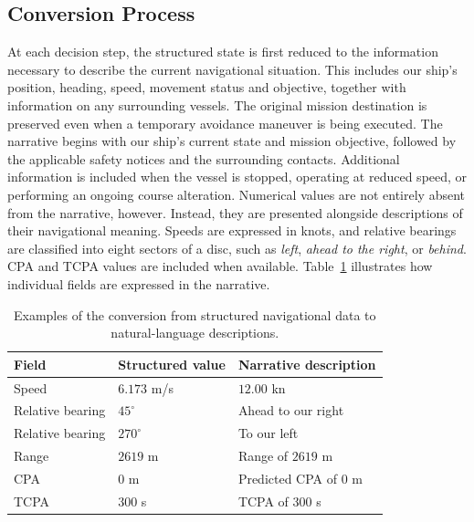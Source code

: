 \documentclass[10pt]{reportMaster}
\begin{document}
\subsection{Conversion Process}

At each decision step, the structured state is first reduced to the information necessary to describe the current navigational situation. This includes our ship's position, heading, speed, movement status and objective, together with information on any surrounding vessels. The original mission destination is preserved even when a temporary avoidance maneuver is being executed. The narrative begins with our ship's current state and mission objective, followed by the applicable safety notices and the surrounding contacts. Additional information is included when the vessel is stopped, operating at reduced speed, or performing an ongoing course alteration. Numerical values are not entirely absent from the narrative, however. Instead, they are presented alongside descriptions of their navigational meaning. Speeds are expressed in knots, and relative bearings are classified into eight sectors of a disc, such as \textit{left}, \textit{ahead to the right}, or \textit{behind}. CPA and TCPA values are included when available. Table~\ref{tab:narrative-conversion} illustrates how
individual fields are expressed in the narrative.

\begin{table}[t]
\centering
\caption{Examples of the conversion from structured
navigational data to natural-language descriptions.}
\label{tab:narrative-conversion}
\begin{threeparttable}
\small
\begin{tabular}{@{}l l l@{}}
\toprule
\textbf{Field}
& \textbf{Structured value}
& \textbf{Narrative description} \\
\midrule
Speed & $6.173$ m/s & $12.00$ kn \\
Relative bearing & $45^\circ$ & Ahead to our right \\
Relative bearing & $270^\circ$ & To our left \\
Range & $2619$ m & Range of $2619$ m \\
CPA & $0$ m & Predicted CPA of $0$ m \\
TCPA & $300$ s & TCPA of $300$ s \\
\bottomrule
\end{tabular}
\end{threeparttable}
\end{table}
\end{document}

